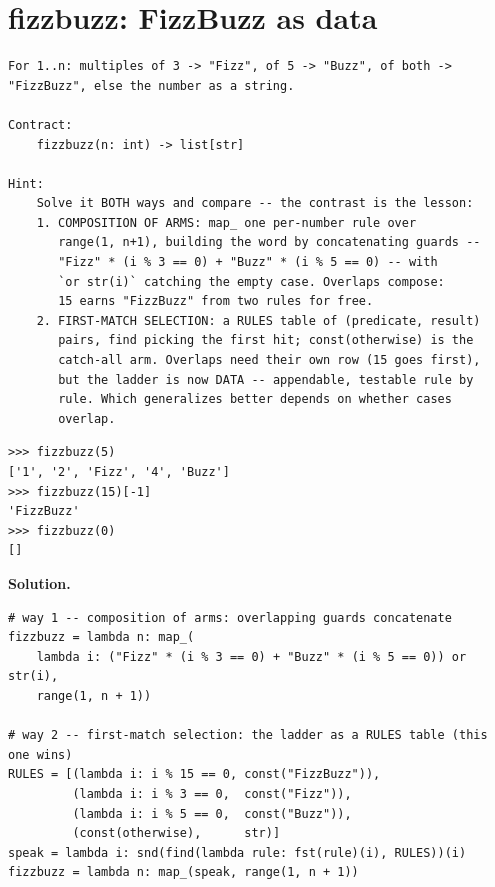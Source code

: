 \documentclass[10pt,letterpaper]{book}
\begin{document}
\section{fizzbuzz: FizzBuzz as data}
\begin{lstlisting}[style=ex]
For 1..n: multiples of 3 -> "Fizz", of 5 -> "Buzz", of both ->
"FizzBuzz", else the number as a string.

Contract:
    fizzbuzz(n: int) -> list[str]

Hint:
    Solve it BOTH ways and compare -- the contrast is the lesson:
    1. COMPOSITION OF ARMS: map_ one per-number rule over
       range(1, n+1), building the word by concatenating guards --
       "Fizz" * (i % 3 == 0) + "Buzz" * (i % 5 == 0) -- with
       `or str(i)` catching the empty case. Overlaps compose:
       15 earns "FizzBuzz" from two rules for free.
    2. FIRST-MATCH SELECTION: a RULES table of (predicate, result)
       pairs, find picking the first hit; const(otherwise) is the
       catch-all arm. Overlaps need their own row (15 goes first),
       but the ladder is now DATA -- appendable, testable rule by
       rule. Which generalizes better depends on whether cases
       overlap.
\end{lstlisting}
\begin{lstlisting}[style=ex]
>>> fizzbuzz(5)
['1', '2', 'Fizz', '4', 'Buzz']
>>> fizzbuzz(15)[-1]
'FizzBuzz'
>>> fizzbuzz(0)
[]
\end{lstlisting}
\noindent\textbf{Solution.}
\begin{lstlisting}[style=code]
# way 1 -- composition of arms: overlapping guards concatenate
fizzbuzz = lambda n: map_(
    lambda i: ("Fizz" * (i % 3 == 0) + "Buzz" * (i % 5 == 0)) or str(i),
    range(1, n + 1))

# way 2 -- first-match selection: the ladder as a RULES table (this one wins)
RULES = [(lambda i: i % 15 == 0, const("FizzBuzz")),
         (lambda i: i % 3 == 0,  const("Fizz")),
         (lambda i: i % 5 == 0,  const("Buzz")),
         (const(otherwise),      str)]
speak = lambda i: snd(find(lambda rule: fst(rule)(i), RULES))(i)
fizzbuzz = lambda n: map_(speak, range(1, n + 1))
\end{lstlisting}
\end{document}
